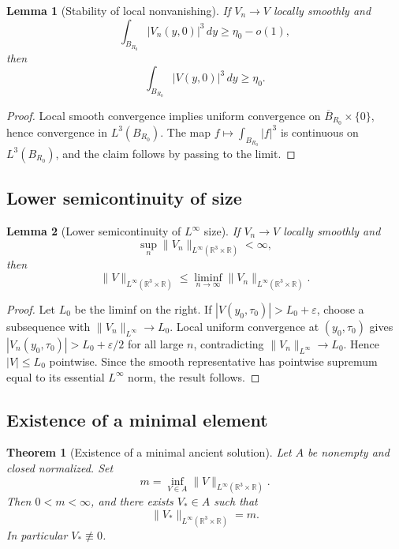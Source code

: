 \documentclass[11pt]{amsart}
\theoremstyle{plain}
\newtheorem{theorem}{Theorem}[section]
\newtheorem{lemma}[lemma]{Lemma}
\theoremstyle{definition}
\theoremstyle{remark}
\numberwithin{equation}{section}
\newcommand{\R}{\mathbb R}
\newcommand{\eps}{\varepsilon}
\begin{document}
\begin{lemma}[Stability of local nonvanishing]\label{p2:lem:nonzero-stability}
If \(V_n\to V\) locally smoothly and
\[
   \int_{B_{R_0}}|V_n(y,0)|^3\,dy\ge \eta_0-o(1),
\]
then
\[
   \int_{B_{R_0}}|V(y,0)|^3\,dy\ge \eta_0 .
\]
\end{lemma}

\begin{proof}
Local smooth convergence implies uniform convergence on
\(\overline B_{R_0}\times\{0\}\), hence convergence in
\(L^3(B_{R_0})\).  The map \(f\mapsto\int_{B_{R_0}}|f|^3\) is continuous on
\(L^3(B_{R_0})\), and the claim follows by passing to the limit.
\end{proof}

\subsection{Lower semicontinuity of size}

\begin{lemma}[Lower semicontinuity of \(L^\infty\) size]
\label{p2:lem:lsc-size}
If \(V_n\to V\) locally smoothly and
\[
   \sup_n\|V_n\|_{L^\infty(\R^3\times\R)}<\infty,
\]
then
\[
   \|V\|_{L^\infty(\R^3\times\R)}
   \le
   \liminf_{n\to\infty}
   \|V_n\|_{L^\infty(\R^3\times\R)}.
\]
\end{lemma}

\begin{proof}
Let \(L_0\) be the liminf on the right.  If
\(|V(y_0,\tau_0)|>L_0+\eps\), choose a subsequence with
\(\|V_n\|_{L^\infty}\to L_0\).  Local uniform convergence at
\((y_0,\tau_0)\) gives
\(|V_n(y_0,\tau_0)|>L_0+\eps/2\) for all large \(n\), contradicting
\(\|V_n\|_{L^\infty}\to L_0\).  Hence \(|V|\le L_0\) pointwise.  Since the
smooth representative has pointwise supremum equal to its essential
\(L^\infty\) norm, the result follows.
\end{proof}

\subsection{Existence of a minimal element}

\begin{theorem}[Existence of a minimal ancient solution]
\label{p2:thm:minimal-existence}
Let \(A\) be nonempty and closed normalized.  Set
\[
   m=
   \inf_{V\in A}
   \|V\|_{L^\infty(\R^3\times\R)}.
\]
Then \(0<m<\infty\), and there exists \(V_*\in A\) such that
\[
   \|V_*\|_{L^\infty(\R^3\times\R)}=m.
\]
In particular \(V_*\not\equiv0\).
\end{theorem}
\end{document}
